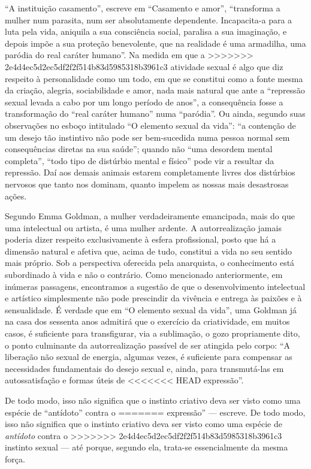 ``A instituição
casamento'', escreve em ``Casamento e amor'', ``transforma a mulher num
parasita, num ser absolutamente dependente. Incapacita-a para a luta
pela vida, aniquila a sua consciência social, paralisa a sua imaginação,
e depois impõe a sua proteção benevolente, que na realidade é uma
armadilha, uma paródia do real caráter humano''. Na medida em que a
>>>>>>> 2e4d4ec5d2ec5df2f2f514b83d5985318b3961c3
atividade sexual é algo que diz respeito à personalidade como um todo,
em que se constitui como a fonte mesma da criação, alegria,
sociabilidade e amor, nada mais natural que ante a ``repressão sexual
levada a cabo por um longo período de anos'', a consequência fosse
a transformação do ``real caráter humano'' numa
``paródia''. Ou ainda, segundo suas observações no esboço intitulado ``O
elemento sexual da vida'': ``a contenção de um desejo tão instintivo não
pode ser bem-sucedida numa pessoa normal sem consequências diretas na
sua saúde''; quando não ``uma desordem mental completa'', ``todo tipo de
distúrbio mental e físico'' pode vir a resultar da repressão. Daí aos
demais animais estarem completamente livres dos distúrbios nervosos que
tanto nos dominam, quanto impelem as nossas mais desastrosas ações.

Segundo Emma Goldman, a mulher verdadeiramente emancipada, mais do que
uma intelectual ou artista, é uma mulher ardente. A autorrealização
jamais poderia dizer respeito exclusivamente à esfera profissional,
posto que há a dimensão natural e afetiva que, acima de tudo, constitui
a vida no seu sentido mais próprio. Sob a perspectiva oferecida pela
anarquista, o conhecimento está subordinado à vida e não o contrário.
Como mencionado anteriormente, em inúmeras passagens, encontramos a
sugestão de que o desenvolvimento intelectual e artístico simplesmente
não pode prescindir da vivência e entrega às paixões e à sensualidade. É
verdade que em ``O elemento sexual da vida'', uma Goldman já na casa dos
sessenta anos admitirá que o exercício da criatividade, em muitos
casos, é suficiente para transfigurar, via a sublimação, o gozo
propriamente dito, o ponto culminante da autorrealização passível de ser
atingida pelo corpo: ``A liberação não sexual de energia, algumas vezes,
é suficiente para compensar as necessidades fundamentais do desejo
sexual e, ainda, para transmutá-las em autossatisfação e formas úteis de
<<<<<<< HEAD
expressão''.

De todo modo, isso não significa que o instinto
criativo deva ser visto como uma espécie de ``antídoto'' contra o
=======
expressão'' --- escreve. De todo modo, isso não significa que o instinto
criativo deva ser visto como uma espécie de \textit{antídoto} contra o
>>>>>>> 2e4d4ec5d2ec5df2f2f514b83d5985318b3961c3
instinto sexual --- até porque, segundo ela, trata-se essencialmente da
mesma força. 

